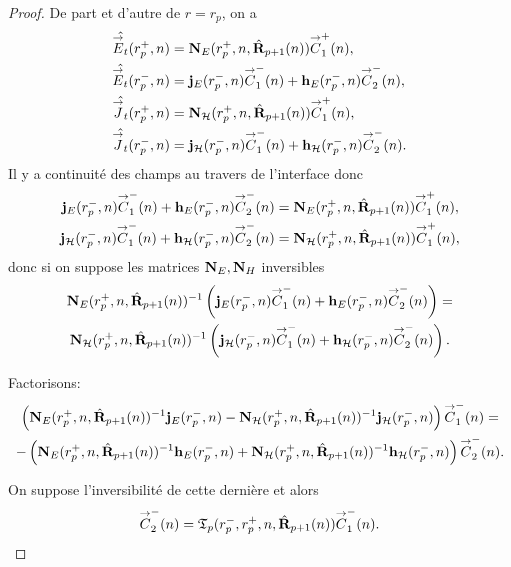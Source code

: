     \begin{proof}
      De part et d'autre de \(r=r_p\), on a 
      \begin{align*}
        \hat{{\overset{\rightarrow}{E}}_t}(r_p^+,n) &= \mathbf{N}_{E}(r_p^+,n,\hat{\mathbf{R}}_{p+1}(n)){\overset{\rightarrow}{C}}_{1}^+(n),
        \\
        \hat{{\overset{\rightarrow}{E}}_t}(r_p^-,n) &= \mathbf{j}_E(r_p^-,n){\overset{\rightarrow}{C}}_{1}^-(n) + \mathbf{h}_E(r_p^-,n){\overset{\rightarrow}{C}}_{2}^-(n),
        \\
        \hat{{\overset{\rightarrow}{J}}_t}(r_p^+,n) &= \mathbf{N}_{\mathcal{H}}(r_p^+,n,\hat{\mathbf{R}}_{p+1}(n)){\overset{\rightarrow}{C}}_{1}^+(n),
        \\
        \hat{{\overset{\rightarrow}{J}}_t}(r_p^-,n) &= \mathbf{j}_{\mathcal{H}}(r_p^-,n){\overset{\rightarrow}{C}}_{1}^-(n) + \mathbf{h}_{\mathcal{H}}(r_p^-,n){\overset{\rightarrow}{C}}_{2}^-(n).
      \end{align*}
      Il y a continuité des champs au travers de l'interface donc
      \begin{align*}
        \mathbf{j}_E(r_p^-,n){\overset{\rightarrow}{C}}_{1}^-(n) + \mathbf{h}_E(r_p^-,n){\overset{\rightarrow}{C}}_{2}^-(n) &= \mathbf{N}_{E}(r_p^+,n,\hat{\mathbf{R}}_{p+1}(n)){\overset{\rightarrow}{C}}_{1}^+(n),
        \\
        \mathbf{j}_{\mathcal{H}}(r_p^-,n){\overset{\rightarrow}{C}}_{1}^-(n) + \mathbf{h}_{\mathcal{H}}(r_p^-,n){\overset{\rightarrow}{C}}_{2}^-(n) &= \mathbf{N}_{\mathcal{H}}(r_p^+,n,\hat{\mathbf{R}}_{p+1}(n)){\overset{\rightarrow}{C}}_{1}^+(n),
      \end{align*}
      donc si on suppose les matrices \(\mathbf{N}_E, \mathbf{N}_H\) inversibles
      \begin{multline*}
        \mathbf{N}_{E}(r_p^+,n,\hat{\mathbf{R}}_{p+1}(n))^{-1}\left(\mathbf{j}_E(r_p^-,n){\overset{\rightarrow}{C}}_{1}^-(n) + \mathbf{h}_E(r_p^-,n){\overset{\rightarrow}{C}}_{2}^-(n)\right) =
        \\
        \mathbf{N}_{\mathcal{H}}(r_p^+,n,\hat{\mathbf{R}}_{p+1}(n))^{-1}\left(\mathbf{j}_{\mathcal{H}}(r_p^-,n){\overset{\rightarrow}{C}}_{1}^-(n) + \mathbf{h}_{\mathcal{H}}(r_p^-,n){\overset{\rightarrow}{C}}_{2}^-(n)\right).
      \end{multline*}

      Factorisons:
      \begin{multline*}
        \left(\mathbf{N}_{E}(r_p^+,n,\hat{\mathbf{R}}_{p+1}(n))^{-1}\mathbf{j}_E(r_p^-,n) - \mathbf{N}_{\mathcal{H}}(r_p^+,n,\hat{\mathbf{R}}_{p+1}(n))^{-1}\mathbf{j}_{\mathcal{H}}(r_p^-,n)\right){\overset{\rightarrow}{C}}_{1}^-(n) =
        \\
        -\left(\mathbf{N}_{E}(r_p^+,n,\hat{\mathbf{R}}_{p+1}(n))^{-1}\mathbf{h}_E(r_p^-,n) + \mathbf{N}_{\mathcal{H}}(r_p^+,n,\hat{\mathbf{R}}_{p+1}(n))^{-1}\mathbf{h}_{\mathcal{H}}(r_p^-,n)\right){\overset{\rightarrow}{C}}_{2}^-(n).
      \end{multline*}

      On suppose l'inversibilité de cette dernière et alors
      \begin{equation*}
        {\overset{\rightarrow}{C}}_{2}^-(n) = \mathfrak{T}_p(r_p^-,r_p^+,n,\hat{\mathbf{R}}_{p+1}(n)) {\overset{\rightarrow}{C}}_{1}^-(n).
      \end{equation*}
    \end{proof}

